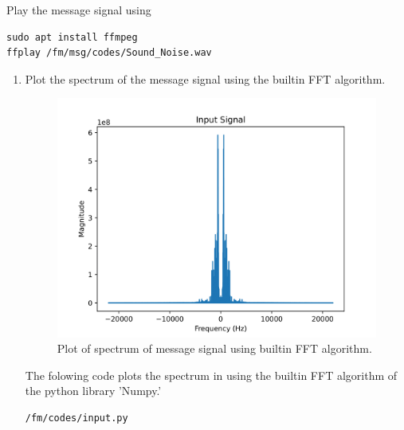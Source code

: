 Play the message signal using
\begin{lstlisting}
sudo apt install ffmpeg
ffplay /fm/msg/codes/Sound_Noise.wav
\end{lstlisting}
\begin{enumerate}[label=\arabic*.,ref=\thesection.\theenumi]
\item Plot the spectrum of the message signal using the builtin FFT algorithm.\\
	\solution		
\begin{figure}[H]
\centering
\includegraphics[width=\columnwidth]{fm/msg/figs/FFTbuiltin/inputs-1.png}
\caption{Plot of spectrum of message signal using builtin FFT algorithm.}
\label{fig:FFTb}
\end{figure}
The folowing code plots the spectrum in  using the builtin FFT algorithm of the python library 'Numpy.'
\begin{lstlisting}
/fm/codes/input.py
\end{lstlisting}


\end{enumerate}
